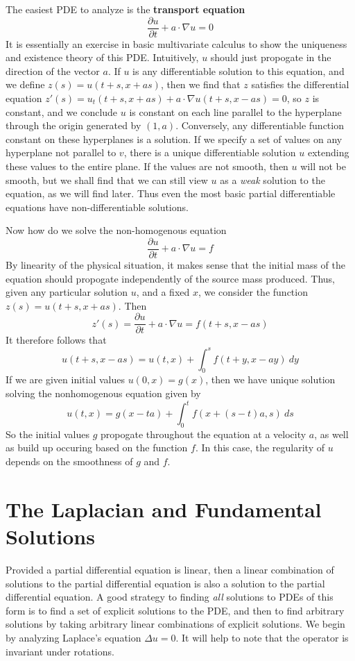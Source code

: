 The easiest PDE to analyze is the {\bf transport equation}
%
\[ \frac{\partial u}{\partial t} + a \cdot \nabla u = 0 \]
%
It is essentially an exercise in basic multivariate calculus to show the uniqueness and existence theory of this PDE. Intuitively, $u$ should just propogate in the direction of the vector $a$. If $u$ is any differentiable solution to this equation, and we define $z(s) = u(t+s, x + as)$, then we find that $z$ satisfies the differential equation $z'(s) = u_t(t+s,x + as) + a \cdot \nabla u(t+s, x - as) = 0$, so $z$ is constant, and we conclude $u$ is constant on each line parallel to the hyperplane through the origin generated by $(1,a)$. Conversely, any differentiable function constant on these hyperplanes is a solution. If we specify a set of values on any hyperplane not parallel to $v$, there is a unique differentiable solution $u$ extending these values to the entire plane. If the values are not smooth, then $u$ will not be smooth, but we shall find that we can still view $u$ as a {\it weak} solution to the equation, as we will find later. Thus even the most basic partial differentiable equations have non-differentiable solutions.

Now how do we solve the non-homogenous equation
%
\[ \frac{\partial u}{\partial t} + a \cdot \nabla u = f \]
%
By linearity of the physical situation, it makes sense that the initial mass of the equation should propogate independently of the source mass produced. Thus, given any particular solution $u$, and a fixed $x$, we consider the function $z(s) = u(t+s, x + as)$. Then
%
\[ z'(s) = \frac{\partial u}{\partial t} + a \cdot \nabla u = f(t + s, x - as) \]
%
It therefore follows that
%
\[ u(t + s, x - as) = u(t,x) + \int_0^s f(t+y,x-ay)\ dy \]
%
If we are given initial values $u(0,x) = g(x)$, then we have unique solution solving the nonhomogenous equation given by
%
\[ u(t,x) = g(x-ta) + \int_0^t f(x + (s-t)a,s)\ ds \]
%
So the initial values $g$ propogate throughout the equation at a velocity $a$, as well as build up occuring based on the function $f$. In this case, the regularity of $u$ depends on the smoothness of $g$ and $f$.

\section{The Laplacian and Fundamental Solutions}

Provided a partial differential equation is linear, then a linear combination of solutions to the partial differential equation is also a solution to the partial differential equation. A good strategy to finding {\it all} solutions to PDEs of this form is to find a set of explicit solutions to the PDE, and then to find arbitrary solutions by taking arbitrary linear combinations of explicit solutions. We begin by analyzing Laplace's equation $\Delta u = 0$. It will help to note that the operator is invariant under rotations.

